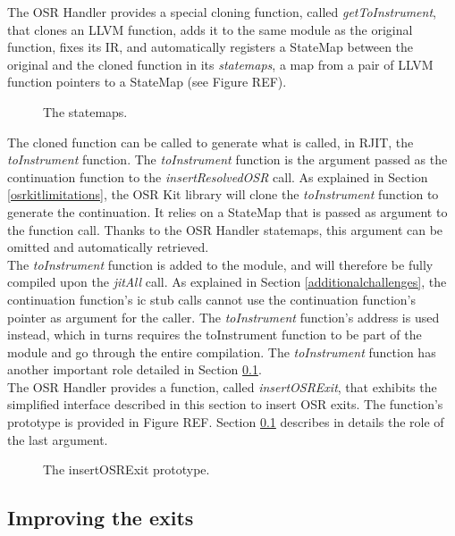 The OSR Handler provides a special cloning function, called \textit{getToInstrument}, that clones an LLVM function, adds it to the same module as the original function, fixes its IR, and automatically registers a StateMap between the original and the cloned function in its \textit{statemaps}, a map from a pair of LLVM function pointers to a StateMap (see Figure REF).\\

\begin{figure}[h]
\caption{The statemaps.}
\label{fig:statemaps}
\end{figure}

The cloned function can be called to generate what is called, in RJIT, the \textit{toInstrument} function.
The \textit{toInstrument} function is the argument passed as the continuation function to the \textit{insertResolvedOSR} call.
As explained in Section \ref{osrkitlimitations}, the OSR Kit library will clone the \textit{toInstrument} function to generate the continuation.
It relies on a StateMap that is passed as argument to the function call. 
Thanks to the OSR Handler statemaps, this argument can be omitted and automatically retrieved.\\

The \textit{toInstrument} function is added to the module, and will therefore be fully compiled upon the \textit{jitAll} call.
As explained in Section \ref{additionalchallenges}, the continuation function's ic stub calls cannot use the continuation function's pointer as argument for the caller. 
The \textit{toInstrument} function's address is used instead, which in turns requires the toInstrument function to be part of the module and go through the entire compilation.
The \textit{toInstrument} function has another important role detailed in Section \ref{improvingexits}.\\

The OSR Handler provides a function, called \textit{insertOSRExit}, that exhibits the simplified interface described in this section to insert OSR exits.
The function's prototype is provided in Figure REF.
Section \ref{improvingexits} describes in details the role of the last argument.\\

\begin{figure}[h]
\caption{The insertOSRExit prototype.}
\label{fig:insertoserexit}
\end{figure}

\subsection{Improving the exits}\label{improvingexits}

